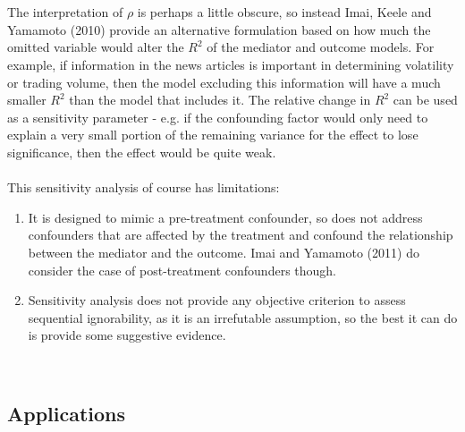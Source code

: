 \documentclass{article}
\begin{document}
	\\~\\
	The interpretation of $\rho$ is perhaps a little obscure, so instead Imai, Keele and Yamamoto (2010) provide an alternative formulation based on how much the omitted variable would alter the $R^2$ of the mediator and outcome models. For example, if information in the news articles is important in determining volatility or trading volume, then the model excluding this information will have a much smaller $R^2$ than the model that includes it. The relative change in $R^2$ can be used as a sensitivity parameter - e.g. if the confounding factor would only need to explain a very small portion of the remaining variance for the effect to lose significance, then the effect would be quite weak. 
	\\~\\
	This sensitivity analysis of course has limitations:
	\begin{enumerate}
		\item It is designed to mimic a pre-treatment confounder, so does not address confounders that are affected by the treatment and confound the relationship between the mediator and the outcome. Imai and Yamamoto (2011) do consider the case of post-treatment confounders though. 
		\item Sensitivity analysis does not provide any objective criterion to assess sequential ignorability, as it is an irrefutable assumption, so the best it can do is provide some suggestive evidence. 
	\end{enumerate}
	~\\
	
	
	
	\subsection{Applications}
	
\end{document}
